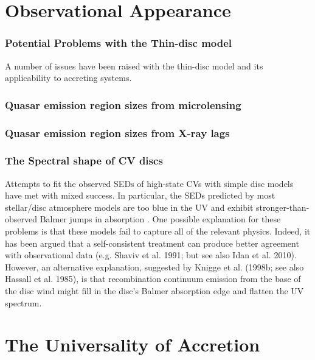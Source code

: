 \section{Observational Appearance}



\subsubsection{Potential Problems with the Thin-disc model}

A number of issues have been raised with the thin-disc model and
its applicability to accreting systems. 

\subsubsection{Quasar emission region sizes from microlensing}

\subsubsection{Quasar emission region sizes from X-ray lags}

\subsubsection{The Spectral shape of CV discs}

Attempts to fit the observed SEDs of high-state CVs with simple disc models have met with mixed success. In
particular, the SEDs predicted by most stellar/disc atmosphere models 
are too blue in the UV \citep{wade1988,long1991,long1994,knigge1998} and exhibit
stronger-than-observed Balmer jumps in absorption 
\citep{wade1984,haug1987,ladous1989b,knigge1998}. One possible
explanation for these problems is that these models fail to capture
all of the relevant physics. Indeed, it has been argued that a
self-consistent treatment can produce better agreement with 
observational data (e.g. Shaviv et al. 1991;  but see also Idan et al. 2010).
\nocite{idanshaviv2010} \nocite{shaviv1991}
However, an alternative explanation, suggested by Knigge et al.
(1998b; see also Hassall et al. 1985)\nocite{KLWB98,hassall}, 
is that recombination continuum emission from the base of the 
disc wind might fill in the disc's Balmer absorption edge and flatten the UV spectrum.

\section{The Universality of Accretion}

